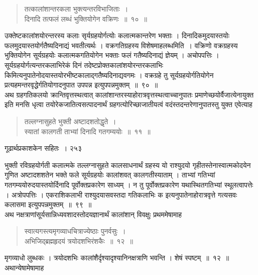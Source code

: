 \documentclass[11pt, openany]{book}
\begin{document}
\begin{quote}
{\ssi तत्कालांशान्तरकला भुक्त्यन्तरविभाजिताः~। \\
दिनादि तत्फलं लब्धं भुक्तियोगेन वक्रिणः~॥~१०~॥}
\end{quote}

 उक्तेष्टकालांशयोरन्तरस्य कलाः सृर्यग्रहयोर्गत्योः कलात्मकान्तरेण भक्ताः । दिनादिकमुदयास्तयोः फलमुदयास्तयोर्गतैष्यदिनाद्यं भवतीत्यर्थः । वक्रगतिग्रहस्य विशेषमाह\textendash लब्धमिति~। वक्रिणो वक्रग्रहस्य भुक्तियोगेन सूर्यग्रहयोः कलात्मकगतियोगेन भक्ताः फलं गतैष्यदिनाद्यं ज्ञेयम् । अचोपपत्तिः । सूर्यग्रहयोर्गत्यन्तरकलाभिरेकं दिनं तदेष्टप्रोक्तकालांशयोरन्तरकलाभिः किमित्यनुपातेनोदयास्तयोरभीष्टकालाद्गतैष्यदिनाद्यवगमः । वक्रग्रहे तु सूर्यग्रहयोर्गतियोगेन प्रत्यहमन्तरवृद्धेर्गतियोगादनुपात उपपन्न इत्युपपन्नमुक्तम्~॥~९०~॥\\
\noindent अथ ग्रहगतिकलयो क्रान्तिवृत्तस्थत्वात् कालांशान्तरस्याहोरात्रवृत्तस्थत्वाच्चानुपातः प्रमाणेच्छयोर्वैजात्येनायुक्त इति मनसि धृत्वा तयोरेकजातित्वसत्पादनार्थं ग्रहगत्योरिच्छाजातीयत्वं वदंस्तदन्तरेणानुपातस्तु युक्त एवेत्याह \textendash


\begin{quote}
{\ssi तल्लग्नासुहते भुक्ती अष्टादशतोद्धृते~।\\ 
स्यातां कालगती ताभ्यां दिनादि गतगम्ययोः~॥~११~॥}
\end{quote}
\newpage

\hspace{3cm} गूढार्थप्रकाशकेन सहितः~। \hfill २५३
\vspace{1cm}


 भुक्ती रविग्रहयोर्गती कलात्मके तल्लग्नासुहते कालसाधनार्थं ग्रहस्य यो राश्युदयो गृहीतस्तेनास्वात्मकोदयेन गुणित अष्टादशशतेन भक्ते फले सूर्यग्रहयोः कालांशवत् कालगतीस्याताम् । ताभ्यां गतिभ्यां गतगम्ययोरुदयास्तयोर्दिनादि पूर्वोक्तप्रकारेण साध्यम् । न तु पूर्वोक्तप्रकारेण यथास्थितगतिभ्यां स्थूलत्वापत्तेः । अत्रोपपत्तिः । एकराशिकलाभी राश्युदयासवस्तदा गतिकलाभिः क इत्यनुपातेनाहोरात्रवृत्ते गत्यसवः कलासमा इत्युपपन्नमुक्तम्~॥~९९~॥\\
 \noindent अथ नक्षत्राणांसूर्यसान्निध्यवशादस्तोदयज्ञानार्थं कालांशान् विवक्षुः प्रथममेषामाह \textendash


\begin{quote}
{\ssi स्वात्यगस्त्यमृगव्याधचित्राज्येष्ठाः पुनर्वसुः~।\\
 अभिजिद्ब्रह्महृदयं त्रयोदशभिरंशकैः~॥~१२~॥ }
\end{quote}
 मृगव्याधो लुब्धकः । त्रयोदशभिः कालांशैर्दृश्यादृश्यानिनक्षत्राणि भवन्ति । शेषं स्पष्टम्~॥~१२~॥ \\
 \noindent अथान्येषामेषामाह \textendash
\end{document}
